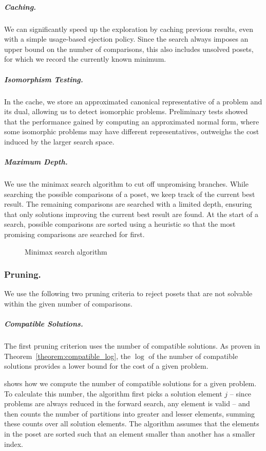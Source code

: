 \documentclass[a4paper,UKenglish,cleveref, autoref, thm-restate]{lipics-v2021}
\begin{document}
\subparagraph{Caching.}
We can significantly speed up the exploration by caching previous results, even with a simple usage-based ejection policy.
Since the search always imposes an upper bound on the number of comparisons, this also includes unsolved posets, for which we record the currently known minimum.

\subparagraph{Isomorphism Testing.}
In the cache, we store an approximated canonical representative of a problem and its dual, allowing us to detect isomorphic problems.
Preliminary tests showed that the performance gained by computing an approximated normal form, where some isomorphic problems may have different representatives, outweighs the cost induced by the larger search space.

\subparagraph{Maximum Depth.}
We use the minimax search algorithm to cut off unpromising branches.
While searching the possible comparisons of a poset, we keep track of the current best result.
The remaining comparisons are searched with a limited depth, ensuring that only solutions improving the current best result are found.
At the start of a search, possible comparisons are sorted using a heuristic so that the most promising comparisons are searched for first.

\begin{figure}[!b]
  \centering
  
  \caption{Minimax search algorithm}
  \label{fig:minimax_search}
\end{figure}

\subsubsection{Pruning.}
We use the following two pruning criteria to reject posets that are not solvable within the given number of comparisons.

\subparagraph{Compatible Solutions.}
The first pruning criterion uses the number of compatible solutions.
As proven in Theorem~\ref{theorem:compatible_log}, the $\log$ of the number of compatible solutions provides a lower bound for the cost of a given problem.

 shows how we compute the number of compatible solutions for a given problem.
To calculate this number, the algorithm first picks a solution element $j$ -- since problems are always reduced in the forward search, any element is valid -- and then counts the number of partitions into greater and lesser elements, summing these counts over all solution elements.
The algorithm assumes that the elements in the poset are sorted such that an element smaller than another has a smaller index.
\end{document}

